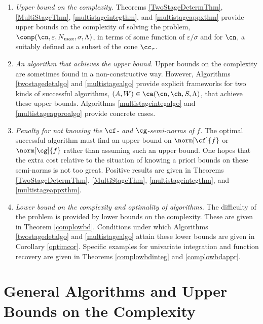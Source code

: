 \documentclass[]{elsarticle}
\theoremstyle{definition}
\theoremstyle{remark}
\begin{document}
\begin{enumerate}

\renewcommand{\labelenumi}{\roman{enumi}.}

\item \emph{Upper bound on the complexity.}
Theorems \ref{TwoStageDetermThm}, \ref{MultiStageThm}, \ref{multistageintegthm}, and \ref{multistageappxthm} provide upper bounds on the complexity of solving the problem, $\comp(\cn,\varepsilon,N_{\max},\sigma,\Lambda)$, in terms of some function of $\varepsilon/\sigma$ and for $\cn$, a suitably defined as a subset of the cone $\cc_{\tau}$.

\item \emph{An algorithm that achieves the upper bound.}  Upper bounds on the complexity are sometimes found in a non-constructive way.  However, Algorithms \ref{twostagedetalgo} and \ref{multistagealgo} provide explicit frameworks for two kinds of successful algorithms, $(A,W) \in \ca(\cn,\ch,S,\Lambda)$, that achieve these upper bounds.  Algorithms \ref{multistageintegalgo} and \ref{multistageapproalgo} provide concrete cases.

\item \emph{Penalty for not knowing the $\cf$- and $\cg$-semi-norms of $f$.} The optimal successful algorithm must find an upper bound on $\norm[\cf]{f}$ or $\norm[\cg]{f}$ rather than assuming such an upper bound.  One hopes that the extra cost relative to the situation of knowing a priori bounds on these semi-norms is not too great.  Positive results are given in Theorems  \ref{TwoStageDetermThm}, \ref{MultiStageThm}, \ref{multistageintegthm}, and \ref{multistageappxthm}.

\item \emph{Lower bound on the complexity and optimality of algorithms.}  The difficulty of the problem is provided by lower bounds on the complexity.  These are given in Theorem \ref{complowbd}.  Conditions under which Algorithms \ref{twostagedetalgo} and \ref{multistagealgo} attain these lower bounds are given in Corollary \ref{optimcor}.  Specific examples for univariate integration and function recovery are given in Theorems \ref{complowbdinteg} and \ref{complowbdappr}.

\end{enumerate}

\section{General Algorithms and Upper Bounds on the Complexity} \label{genthmsec}
\end{document}
